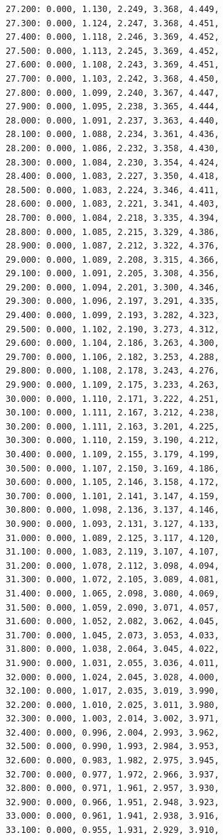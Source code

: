 \documentclass[12pt, a4paper]{article}
\begin{document}
\begin{scriptsize}
\begin{ttfamily}
\begin{lstlisting}
27.200: 0.000, 1.130, 2.249, 3.368, 4.449, 
27.300: 0.000, 1.124, 2.247, 3.368, 4.451, 
27.400: 0.000, 1.118, 2.246, 3.369, 4.452, 
27.500: 0.000, 1.113, 2.245, 3.369, 4.452, 
27.600: 0.000, 1.108, 2.243, 3.369, 4.451, 
27.700: 0.000, 1.103, 2.242, 3.368, 4.450, 
27.800: 0.000, 1.099, 2.240, 3.367, 4.447, 
27.900: 0.000, 1.095, 2.238, 3.365, 4.444, 
28.000: 0.000, 1.091, 2.237, 3.363, 4.440, 
28.100: 0.000, 1.088, 2.234, 3.361, 4.436, 
28.200: 0.000, 1.086, 2.232, 3.358, 4.430, 
28.300: 0.000, 1.084, 2.230, 3.354, 4.424, 
28.400: 0.000, 1.083, 2.227, 3.350, 4.418, 
28.500: 0.000, 1.083, 2.224, 3.346, 4.411, 
28.600: 0.000, 1.083, 2.221, 3.341, 4.403, 
28.700: 0.000, 1.084, 2.218, 3.335, 4.394, 
28.800: 0.000, 1.085, 2.215, 3.329, 4.386, 
28.900: 0.000, 1.087, 2.212, 3.322, 4.376, 
29.000: 0.000, 1.089, 2.208, 3.315, 4.366, 
29.100: 0.000, 1.091, 2.205, 3.308, 4.356, 
29.200: 0.000, 1.094, 2.201, 3.300, 4.346, 
29.300: 0.000, 1.096, 2.197, 3.291, 4.335, 
29.400: 0.000, 1.099, 2.193, 3.282, 4.323, 
29.500: 0.000, 1.102, 2.190, 3.273, 4.312, 
29.600: 0.000, 1.104, 2.186, 3.263, 4.300, 
29.700: 0.000, 1.106, 2.182, 3.253, 4.288, 
29.800: 0.000, 1.108, 2.178, 3.243, 4.276, 
29.900: 0.000, 1.109, 2.175, 3.233, 4.263, 
30.000: 0.000, 1.110, 2.171, 3.222, 4.251, 
30.100: 0.000, 1.111, 2.167, 3.212, 4.238, 
30.200: 0.000, 1.111, 2.163, 3.201, 4.225, 
30.300: 0.000, 1.110, 2.159, 3.190, 4.212, 
30.400: 0.000, 1.109, 2.155, 3.179, 4.199, 
30.500: 0.000, 1.107, 2.150, 3.169, 4.186, 
30.600: 0.000, 1.105, 2.146, 3.158, 4.172, 
30.700: 0.000, 1.101, 2.141, 3.147, 4.159, 
30.800: 0.000, 1.098, 2.136, 3.137, 4.146, 
30.900: 0.000, 1.093, 2.131, 3.127, 4.133, 
31.000: 0.000, 1.089, 2.125, 3.117, 4.120, 
31.100: 0.000, 1.083, 2.119, 3.107, 4.107, 
31.200: 0.000, 1.078, 2.112, 3.098, 4.094, 
31.300: 0.000, 1.072, 2.105, 3.089, 4.081, 
31.400: 0.000, 1.065, 2.098, 3.080, 4.069, 
31.500: 0.000, 1.059, 2.090, 3.071, 4.057, 
31.600: 0.000, 1.052, 2.082, 3.062, 4.045, 
31.700: 0.000, 1.045, 2.073, 3.053, 4.033, 
31.800: 0.000, 1.038, 2.064, 3.045, 4.022, 
31.900: 0.000, 1.031, 2.055, 3.036, 4.011, 
32.000: 0.000, 1.024, 2.045, 3.028, 4.000, 
32.100: 0.000, 1.017, 2.035, 3.019, 3.990, 
32.200: 0.000, 1.010, 2.025, 3.011, 3.980, 
32.300: 0.000, 1.003, 2.014, 3.002, 3.971, 
32.400: 0.000, 0.996, 2.004, 2.993, 3.962, 
32.500: 0.000, 0.990, 1.993, 2.984, 3.953, 
32.600: 0.000, 0.983, 1.982, 2.975, 3.945, 
32.700: 0.000, 0.977, 1.972, 2.966, 3.937, 
32.800: 0.000, 0.971, 1.961, 2.957, 3.930, 
32.900: 0.000, 0.966, 1.951, 2.948, 3.923, 
33.000: 0.000, 0.961, 1.941, 2.938, 3.916, 
33.100: 0.000, 0.955, 1.931, 2.929, 3.910, 

\end{lstlisting}
\end{ttfamily}
\end{scriptsize}
\end{document}
